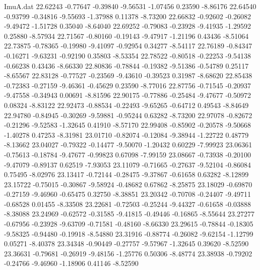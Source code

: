 \begin{filecontents}{ImuA.dat}
  22.62243   -0.77647   -0.39840   -9.56531   -1.07456    0.23590   -8.86176
  22.64540   -0.93799   -0.34816   -9.55693   -1.37988    0.11378   -8.73200
  22.66832   -0.92602   -0.26082   -9.49472   -1.51728    0.35040   -8.64040
  22.69252   -0.79083   -0.23928   -9.41935   -1.29592    0.25880   -8.57934
  22.71567   -0.80160   -0.19143   -9.47917   -1.21196    0.43436   -8.51064
  22.73875   -0.78365   -0.19980   -9.41097   -0.92954    0.34277   -8.54117
  22.76189   -0.84347   -0.16271   -9.63231   -0.92190    0.35803   -8.53354
  22.78522   -0.80518   -0.22253   -9.54138   -0.66238    0.43436   -8.66330
  22.80836   -0.78844   -0.19382   -9.51386   -0.54789    0.25117   -8.65567
  22.83128   -0.77527   -0.23569   -9.43610   -0.39523    0.31987   -8.68620
  22.85438   -0.72383   -0.27159   -9.46361   -0.45629    0.23590   -8.77016
  22.87756   -0.71545   -0.20937   -9.47558   -0.34943    0.00691   -8.81596
  22.90175   -0.77886   -0.25484   -9.47677   -0.50972    0.08324   -8.83122
  22.92473   -0.88534   -0.22493   -9.65265   -0.64712    0.49543   -8.84649
  22.94780   -0.84945   -0.30269   -9.59881   -0.95244    0.63282   -8.73200
  22.97078   -0.82672   -0.21296   -9.52583   -1.32645    0.41910   -8.57170
  22.99408   -0.85902   -0.20578   -9.50668   -1.40278    0.47253   -8.31981
  23.01710   -0.82074   -0.12084   -9.38944   -1.22722    0.48779   -8.13662
  23.04027   -0.79322   -0.14477   -9.50070   -1.20432    0.60229   -7.99923
  23.06361   -0.75613   -0.18784   -9.47677   -0.99823    0.67098   -7.99159
  23.08667   -0.73938   -0.20100   -9.47079   -0.89137    0.62519   -7.93053
  23.11079   -0.71665   -0.27637   -9.52104   -0.86084    0.75495   -8.02976
  23.13417   -0.72144   -0.28475   -9.37867   -0.61658    0.63282   -8.12899
  23.15722   -0.75015   -0.30867   -9.58924   -0.48682    0.67862   -8.25875
  23.18029   -0.69870   -0.27159   -9.46960   -0.65475    0.32750   -8.38851
  23.20342   -0.70708   -0.24407   -9.49711   -0.68528    0.01455   -8.33508
  23.22681   -0.72503   -0.25244   -9.44327   -0.61658   -0.03888   -8.38088
  23.24969   -0.62572   -0.31585   -9.41815   -0.49446   -0.16865   -8.55644
  23.27277   -0.67956   -0.23928   -9.63709   -0.71581   -0.48160   -8.66330
  23.29615   -0.78844   -0.18305   -9.58325   -0.94480   -0.19918   -8.54880
  23.31916   -0.88774   -0.26082   -9.62154   -1.12799    0.05271   -8.40378
  23.34348   -0.90449   -0.27757   -9.57967   -1.32645    0.39620   -8.52590
  23.36631   -0.79681   -0.26919   -9.48156   -1.25776    0.50306   -8.48774
  23.38938   -0.79202   -0.24766   -9.46960   -1.18906    0.41146   -8.52590

\end{filecontents}
